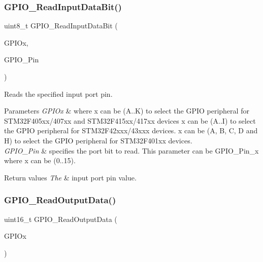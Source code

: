 \subsubsection{\texorpdfstring{G\+P\+I\+O\+\_\+\+Read\+Input\+Data\+Bit()}{GPIO\_ReadInputDataBit()}}
{\footnotesize\ttfamily uint8\+\_\+t G\+P\+I\+O\+\_\+\+Read\+Input\+Data\+Bit (\begin{DoxyParamCaption}\item[{G\+P\+I\+O\+\_\+\+Type\+Def $\ast$}]{G\+P\+I\+Ox,  }\item[{uint16\+\_\+t}]{G\+P\+I\+O\+\_\+\+Pin }\end{DoxyParamCaption})}



Reads the specified input port pin. 


\begin{DoxyParams}{Parameters}
{\em G\+P\+I\+Ox} & where x can be (A..K) to select the G\+P\+IO peripheral for S\+T\+M32\+F405xx/407xx and S\+T\+M32\+F415xx/417xx devices x can be (A..I) to select the G\+P\+IO peripheral for S\+T\+M32\+F42xxx/43xxx devices. x can be (A, B, C, D and H) to select the G\+P\+IO peripheral for S\+T\+M32\+F401xx devices. \\
\hline
{\em G\+P\+I\+O\+\_\+\+Pin} & specifies the port bit to read. This parameter can be G\+P\+I\+O\+\_\+\+Pin\+\_\+x where x can be (0..15). \\
\hline
\end{DoxyParams}

\begin{DoxyRetVals}{Return values}
{\em The} & input port pin value. \\
\hline
\end{DoxyRetVals}
\mbox{\label{group___g_p_i_o_gaf8938a34280b7dc3e39872a7c17bb323}} 
\subsubsection{\texorpdfstring{G\+P\+I\+O\+\_\+\+Read\+Output\+Data()}{GPIO\_ReadOutputData()}}
{\footnotesize\ttfamily uint16\+\_\+t G\+P\+I\+O\+\_\+\+Read\+Output\+Data (\begin{DoxyParamCaption}\item[{G\+P\+I\+O\+\_\+\+Type\+Def $\ast$}]{G\+P\+I\+Ox }\end{DoxyParamCaption})}



